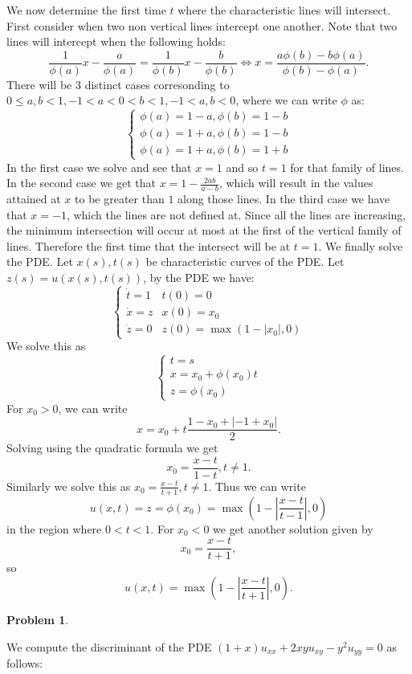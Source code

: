 \documentclass[12pt, a4paper]{article}
\newtheorem{problem}{Problem}
\theoremstyle{definition}
\begin{document}
We now determine the first time $t$ where the characteristic lines will intersect. First consider when two non vertical lines intercept one another. Note that two lines will intercept when the following holds: 
$$\frac{1}{\phi(a)} x - \frac{a}{\phi(a)} = \frac{1}{\phi(b)} x - \frac{b}{\phi(b)} \iff x = \frac{a\phi(b) - b\phi(a)}{\phi(b) - \phi(a)}.$$
There will be 3 distinct cases corresonding to $0\leq a,b<1, -1<a<0<b<1, -1<a,b<0$, where we can write $\phi$ as: 
$$\begin{cases}
	\phi(a) = 1-a, \phi(b) = 1-b\\
	\phi(a) = 1+a, \phi(b) = 1-b\\
	\phi(a) = 1+a, \phi(b) = 1+b
\end{cases}$$
In the first case we solve and see that $x=1$ and so $t=1$ for that family of lines. 
In the second case we get that $x = 1 - \frac{2ab}{a-b}$, which will result in the values attained at $x$ to be greater than $1$ along those lines. In the third case we have that $x= -1$, which the lines are not defined at. Since all the lines are increasing, the minimum intersection will occur at most at the first of the vertical family of lines. Therefore the first time that the intersect will be at $t=1$. 
We finally solve the PDE. Let $x(s), t(s)$ be characteristic curves of the PDE. Let $z(s) = u(x(s), t(s))$, by the PDE we have: 
$$\begin{cases} 
	\dot{t} = 1 &t(0) = 0\\
	\dot{x} =z & x(0) = x_0\\
	\dot{z} = 0 & z(0) = \max{(1-|x_0|,0) }
\end{cases}$$
We solve this as 
$$\begin{cases}
t = s\\
	x = x_0 + \phi(x_0)t\\
	z = \phi(x_0)
\end{cases}$$
For $x_0>0$, we can write $$x = x_0 +t  \frac{1 - x_0 +|-1+x_0|}{2}.$$
Solving using the quadratic formula we get $$x_0 = \frac{x-t}{1-t}, t\neq1.$$
Similarly we solve this as $x_0 = \frac{x-t}{t+1} , t\neq 1$. Thus we can write $$u(x,t) =z = \phi(x_0) = \max\left( 1 - \left| \frac{x-t}{t-1} \right|, 0 \right)$$ in the region where $0<t<1$. For $x_0<0$ we get another solution 
given by $$x_0 = \frac{x-t}{t+1},$$ so $$u(x,t) = \max\left( 1 - \left|\frac{x-t}{t+1} \right|,0 \right).$$
 \newpage 
\begin{problem}
\end{problem}
We compute the discriminant of the PDE $(1+x)u_{xx} + 2xyu_{xy} - y^2u_{yy} =0$  as follows:
\end{document}
